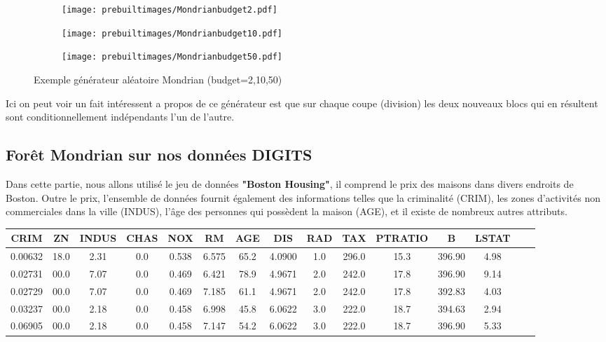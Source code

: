 \begin{figure}[H]
  \centering
  \begin{subfigure}{.3\linewidth}
    \centering
    \texttt{[image: prebuiltimages/Mondrianbudget2.pdf]}
  \end{subfigure}%
  \hspace{1em}%
  \begin{subfigure}{.3\linewidth}
    \centering
    \texttt{[image: prebuiltimages/Mondrianbudget10.pdf]}
  \end{subfigure}%
  \hspace{2em}%
  \begin{subfigure}{.3\linewidth}
    \centering
    \texttt{[image: prebuiltimages/Mondrianbudget50.pdf]}
  \end{subfigure}
  \caption{Exemple générateur aléatoire Mondrian (budget=2,10,50)}
\end{figure}


Ici on peut voir un fait intéressent a propos de ce générateur est que sur chaque coupe (division) les deux nouveaux blocs qui en résultent sont conditionnellement indépendants l'un de l'autre. 

\newpage

\subsection{Forêt Mondrian sur nos données DIGITS}
Dans cette partie, nous allons utilisé le jeu de données \textbf{"Boston Housing"}, il comprend le prix des maisons dans divers endroits de Boston. Outre le prix, l'ensemble de données fournit également des informations telles que la criminalité (CRIM), les zones d'activités non commerciales dans la ville (INDUS), l'âge des personnes qui possèdent la maison (AGE), et il existe de nombreux autres attributs.

\begin{center}
\begin{tabular}{ c c c c c c c c c c c c c c c}
\hline
CRIM & ZN & INDUS & CHAS & NOX & RM & AGE & DIS & RAD & TAX & PTRATIO & B & LSTAT\\
\hline
0.00632 & 18.0 & 2.31 & 0.0 & 0.538 & 6.575	& 65.2 & 4.0900	& 1.0 & 296.0 & 15.3 & 396.90 & 4.98\\
0.02731 & 00.0 & 7.07 & 0.0 & 0.469	& 6.421	& 78.9 & 4.9671	& 2.0 & 242.0 & 17.8 & 396.90 & 9.14\\
0.02729 & 00.0 & 7.07 & 0.0 & 0.469	& 7.185	& 61.1 & 4.9671	& 2.0 & 242.0 & 17.8 & 392.83 & 4.03\\
0.03237 & 00.0 & 2.18 & 0.0 & 0.458	& 6.998	& 45.8 & 6.0622	& 3.0 & 222.0 & 18.7 & 394.63 & 2.94\\
0.06905 & 00.0 & 2.18 & 0.0 & 0.458	& 7.147	& 54.2 & 6.0622	& 3.0 & 222.0 & 18.7 & 396.90 & 5.33\\
\hline
\end{tabular}
\end{center}

